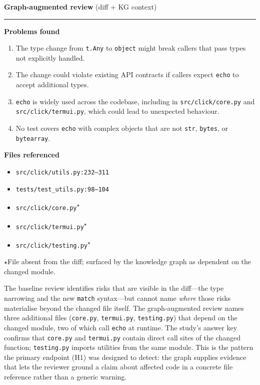 \begin{minipage}[t]{0.48\textwidth}
\noindent\textbf{Graph-augmented review} (diff + KG context)\par
\smallskip\hrule\smallskip
{\small
\textbf{Problems found}
\begin{enumerate}[leftmargin=*,itemsep=2pt]
\item The type change from \texttt{t.Any} to \texttt{object} might break
      callers that pass types not explicitly handled.
\item The change could violate existing API contracts if callers expect
      \texttt{echo} to accept additional types.
\item \texttt{echo} is widely used across the codebase, including in
      \texttt{src/click/core.py} and \texttt{src/click/termui.py}, which
      could lead to unexpected behaviour.\label{itm:kg-callers}
\item No test covers \texttt{echo} with complex objects that are not
      \texttt{str}, \texttt{bytes}, or \texttt{bytearray}.
\end{enumerate}

\textbf{Files referenced}
\begin{itemize}[leftmargin=*,itemsep=1pt]
\item \texttt{src/click/utils.py:232--311}
\item \texttt{tests/test\_utils.py:98--104}
\item \texttt{src/click/core.py}\;\textsuperscript{$\star$}
\item \texttt{src/click/termui.py}\;\textsuperscript{$\star$}
\item \texttt{src/click/testing.py}\;\textsuperscript{$\star$}
\end{itemize}

\smallskip
{\footnotesize $\star$\;File absent from the diff; surfaced by the
knowledge graph as dependent on the changed module.}
}
\end{minipage}

\bigskip

The baseline review identifies risks that are visible in the diff---the
type narrowing and the new \texttt{match} syntax---but cannot name
\emph{where} those risks materialise beyond the changed file itself.  The
graph-augmented review names three additional files
(\texttt{core.py}, \texttt{termui.py}, \texttt{testing.py}) that depend on
the changed module, two of which call \texttt{echo} at runtime.  The
study's answer key confirms that
\texttt{core.py} and \texttt{termui.py} contain direct call sites of the
changed function; \texttt{testing.py} imports utilities from the same
module.  This is the pattern the primary endpoint (H1) was designed to
detect: the graph supplies evidence that lets the reviewer ground a claim
about affected code in a concrete file reference rather than a generic
warning.
